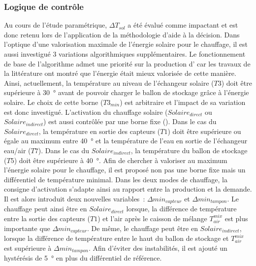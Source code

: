 \subsubsection{Logique de contrôle} %
\label{ssub:logique_de_controle}
Au cours de l’étude paramétrique, $\Delta T_{sol}$ a été évalué comme impactant et est
donc retenu lors de l’application de la méthodologie d’aide à la décision. Dans l’optique
d’une valorisation maximale de l’énergie solaire pour le chauffage, il est aussi
investigué $3$ variations algorithmiques supplémentaires. Le fonctionnement de base de
l’algorithme admet une priorité sur la production d’ car les travaux de la
littérature ont montré que l’énergie était mieux valorisée de cette manière. Ainsi,
actuellement, la température au niveau de l’échangeur solaire ($T3$) doit être supérieure
à \SI{30}{\degree} avant de pouvoir charger le ballon de stockage grâce à l’énergie solaire. Le
choix de cette borne ($T3_{min}$) est arbitraire et l’impact de sa variation est donc
investigué. L’activation du chauffage solaire ($Solaire_{direct}$ ou $Solaire_{indirect}$)
est aussi contrôlée par une borne fixe (). Dans le cas
du $Solaire_{direct}$, la température en sortie des capteurs ($T1$) doit être supérieure ou
égale au maximum entre \SI{40}{\degree} et la température de l’eau en sortie de
l’échangeur eau/air ($T7$). Dans le cas du $Solaire_{indirect}$, la température du ballon
de stockage ($T5$) doit être supérieure à \SI{40}{\degree}. Afin de chercher à valoriser au
maximum l’énergie solaire pour le chauffage, il est proposé non pas une borne fixe mais un
différentiel de température minimal. Dans les deux modes de chauffage, la consigne
d’activation s’adapte ainsi au rapport entre la production et la demande. Il est alors
introduit deux nouvelles variables~: $\Delta min_{capteur}$ et $\Delta min_{tampon}$. Le
chauffage peut ainsi être en $Solaire_{direct}$ lorsque, la différence de température
entre la sortie des capteurs ($T1$) et l’air après le caisson de mélange $T_{air}^{mix}$
est plus importante que $\Delta min_{capteur}$. De même, le chauffage peut être en
$Solaire_{indirect}$, lorsque la différence de température entre le haut du ballon de stockage
et $T_{air}^{mix}$ est supérieure à $\Delta min_{tampon}$. Afin d’éviter des instabilités,
il est ajouté un hystérésis de \SI{5}{\degree} en plus du différentiel de référence.



